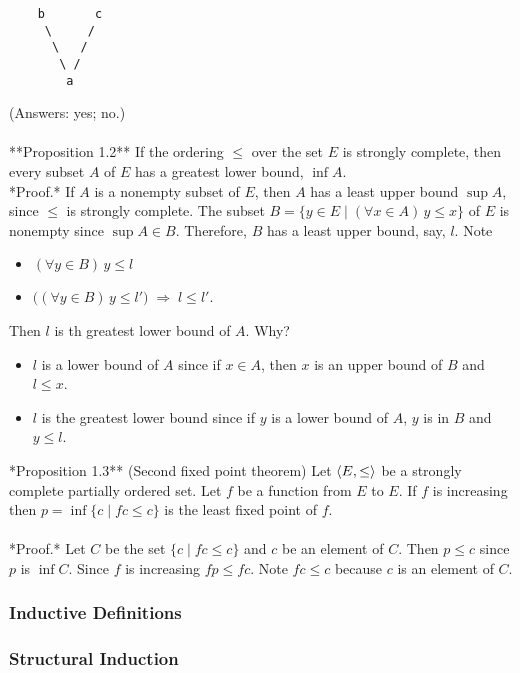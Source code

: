 \begin{verbatim}
    b       c
     \     /
      \   /
       \ /
        a
\end{verbatim}
(Answers: yes; no.)\\
\\
**Proposition 1.2** If the ordering $\leq$ over the set $E$ is strongly
complete, then every subset $A$ of $E$ has a greatest lower bound, $\inf A$.\\[4pt]
*Proof.* If $A$ is a nonempty subset of $E$, then $A$ has a least upper bound
$\sup  A$, since $\leq$ is strongly complete. 
The subset $B = \{ y \in E \mid (\forall x \in A)\, y \leq x \}$ 
of $E$ is nonempty since $\sup A\in B$.
Therefore, $B$ has a least upper bound, say, $l$. Note
\begin{itemize}
\item $(\forall y\in B) \, y \leq l$
\item $\bigl((\forall y\in B)\, y \leq l'\bigr)\; \Rightarrow \; l \leq l'$.
\end{itemize}

Then $l$ is th greatest lower bound of $A$. Why?
\begin{itemize}
\item 
 $l$ is a lower bound of $A$ since if $x \in A$, then $x$ is an upper bound of $B$ and
 $l \leq x$.
\item $l$ is the greatest lower bound since if $y$ is a lower bound of $A$, 
$y$ is in $B$ and $y \leq l$.
\end{itemize}

\medskip

\noindent **Proposition 1.3** (Second fixed point theorem) Let $\langle E, \leq\rangle$ be a strongly
  complete partially ordered set.  Let $f$ be a function from $E$ to $E$. If
  $f$ is increasing then $p = \inf \{c \mid f c \leq c\}$ is the least fixed point
  of $f$.\\
\\
*Proof.* Let $C$ be the set $\{c \mid f c \leq c\}$ and $c$ be an element of $C$. Then
 $p \leq c$ since $p$ is $\inf C$. Since $f$ is increasing $f p \leq f c$. Note 
 $f c \leq c$ because $c$ is an element of $C$. 

\subsubsection{Inductive Definitions}
\subsubsection{Structural Induction}
